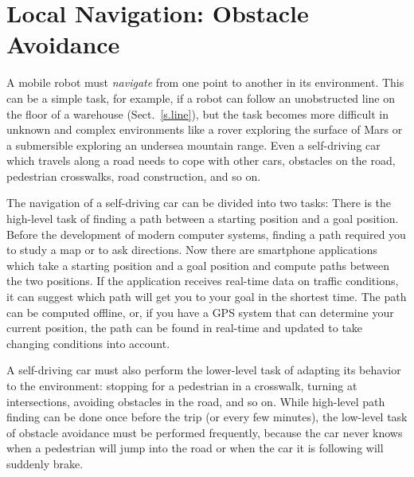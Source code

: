 
\chapter{Local Navigation: Obstacle Avoidance}\label{ch.obstacle}


A mobile robot must \emph{navigate} from one point to another in its environment. This can be a simple task, for example, if a robot can follow an unobstructed line on the floor of a warehouse (Sect.~\ref{s.line}), but the task becomes more difficult in unknown and complex environments like a rover exploring the surface of Mars or a submersible exploring an undersea mountain range. Even a self-driving car which travels along a road needs to cope with other cars, obstacles on the road, pedestrian crosswalks, road construction, and so on. 

The navigation of a self-driving car can be divided into two tasks: There is the high-level task of finding a path between a starting position and a goal position. Before the development of modern computer systems, finding a path required you to study a map or to ask directions. Now there are smartphone applications which take a starting position and a goal position and compute paths between the two positions. If the application receives real-time data on traffic conditions, it can suggest which path will get you to your goal in the shortest time. The path can be computed offline, or, if you have a GPS system that can determine your current position, the path can be found in real-time and updated to take changing conditions into account.

A self-driving car must also perform the lower-level task of adapting its behavior to the environment: stopping for a pedestrian in a crosswalk, turning at intersections, avoiding obstacles in the road, and so on. While high-level path finding can be done once before the trip (or every few minutes), the low-level task of obstacle avoidance must be performed frequently, because the car never knows when a pedestrian will jump into the road or when the car it is following will suddenly brake.


